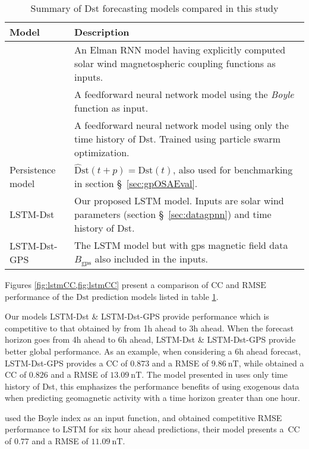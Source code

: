\begin{table}[ht]
	\centering
	\caption{Summary of Dst forecasting models compared in this study}
	\label{table:competingmodels}
	\begin{tabular}{ l  p{} }
		\hline
		\textbf{Model} & \textbf{Description}\\
		\hline
		\citet{wu1997geomagnetic} & An Elman RNN model having explicitly computed solar wind magnetospheric 
		coupling functions as inputs.\\
		\citet{Bala2012} & A feedforward neural network model using the \emph{Boyle} function as input.\\
		\citet{Lazzus} & A feedforward neural network model using only the time history of Dst. Trained using 
		particle swarm optimization.\\
		Persistence model & $\mathrm{\hat{D}st}(t + p) = \mathrm{Dst}(t)$, also used for benchmarking in 
		section \S~\ref{sec:gpOSAEval}.\\
		LSTM-Dst & Our proposed LSTM model. Inputs are solar wind parameters (section \S~\ref{sec:datagpnn}) 
		and time history of Dst.\\
		LSTM-Dst-GPS & The LSTM model but with gps magnetic field data $B_{\text{gps}}$ also included in the inputs. \\
		\hline
	\end{tabular}
\end{table}

Figures \cref{fig:lstmCC,fig:lstmCC} present a comparison of $\mathrm{CC}$ and $\mathrm{RMSE}$ performance of the 
$\mathrm{Dst}$ prediction models listed in table \ref{table:competingmodels}. 

Our models LSTM-Dst \& LSTM-Dst-GPS provide performance which is competitive to that obtained by 
\citet{Lazzus} from 1h ahead to 3h ahead. When the forecast horizon goes from 4h ahead to 6h ahead, 
LSTM-Dst \& LSTM-Dst-GPS provide better global performance. As an example, when considering a 6h 
ahead forecast, LSTM-Dst-GPS provides a CC of $0.873$ and a RMSE of $\SI{9.86}{\nano\tesla}$, while \citet{Lazzus} 
obtained a CC of $0.826$ and a RMSE of $\SI{13.09}{\nano\tesla}$. The model presented in \citet{Lazzus} uses only 
time history of Dst, this emphasizes the performance benefits of using exogenous data when predicting geomagnetic activity 
with a time horizon greater than one hour. 

\citet{Bala2012} used the Boyle index as an input function, and obtained competitive RMSE performance to LSTM for 
six hour ahead predictions, their model presents a\ CC of $0.77$ and a RMSE of $\SI{11.09}{\nano\tesla}$.

